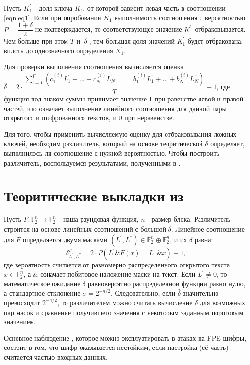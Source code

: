 \documentclass[utf8x, 14pt]{G7-32} %
\begin{document}
Пусть $K_1^{'}$ - доля ключа $K_1$, от которой зависит левая часть в соотношении \ref{eqn:eq1}. Если при опробовании $K_1^{'}$ выполнимость соотношения с вероятностью $P = \dfrac{1+\delta}{2}$ не подтверждается, то соответствующее значение $K_1^{'}$ отбраковывается. Чем больше при этом $T$ и $|\delta|$, тем большая доля значений $K_1^{'}$ будет отбракована, вплоть до однозначного определения $K_1^{'}$.

Для проверки выполнения соотношения вычисляется оценка $\hat{\delta} = 2\cdot\dfrac{\sum_{i=1}^T \left(c_1^{(i)} L_1^{'} + ... + c_N^{(i)} L_N^{'} == b_1^{(i)} L_1^{''} + ... + b_N^{(i)} L_N^{''}\right)} {T} - 1 $, где функция под знаком суммы принимает значение 1 при равенстве левой и правой частей, что означает выполнение линейного соотношения для данной пары открытого и шифрованного текстов, и 0 при неравенстве.

Для того, чтобы применить вычисляемую оценку для отбраковывания ложных ключей, необходим различитель, который на основе теоритической $\delta$ определяет, выполнилось ли соотношение с нужной вероятностью. Чтобы построить различитель, воспользуемся результатами, полученными в \cite{main_paper}.


\section{Теоритические выкладки из \cite{main_paper}}
Пусть $F: \mathbb{F}_2^n \to \mathbb{F}_2^n$ - наша раундовая функция, $n$ - размер блока. Различитель строится на основе линейных соотношений с большой $\delta$. Линейное соотношение для $F$ определяется двумя масками $(L^{'}, L^{''}) \in \mathbb{F}_2^n \oplus \mathbb{F}_2^n$, и их $\delta$ равна:
$$ \delta_{L^{'}, L^{''}}^{F} = 2\cdot P\left(L^{'} \& F(x) = L^{''} \& x\right)-1 ,$$
где вероятность считается от равномерно распределенного открытого текста  $x\in \mathbb{F}_2^n$, а \& означает побитовое наложение маски на текст. Если $L^{'} \neq 0$, то математическое ожидание $\delta$ равновероятно распределенной функции равно нулю, а стандартное отклонение $\sigma = 2^{-n/2}$. Следовательно, если $\hat{\delta}$ значительно превосходит $2^{-n/2}$, то различителем можно считать вычисление $\hat{\delta}$ для возможных пар масок и сравнение получившего значения с некоторым заданным пороговым значением.

Основное наблюдение \cite{main_paper}, которое можно эксплуатировать в атаках на FPE шифры, состоит в том, что шифр оказывается нестойким, если настройка (её часть) считается частью входных данных.
\end{document}
